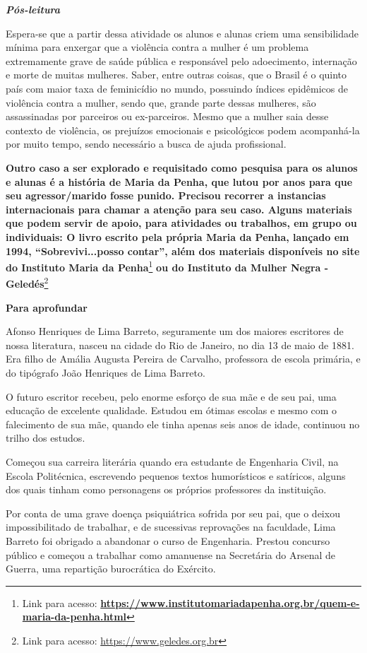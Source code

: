 \emph{\textbf{Pós-leitura}}

Espera-se que a partir dessa atividade os alunos e alunas criem uma
sensibilidade mínima para enxergar que a violência contra a mulher é um
problema extremamente grave de saúde pública e responsável pelo
adoecimento, internação e morte de muitas mulheres. Saber, entre outras
coisas, que o Brasil é o quinto país com maior taxa de feminicídio no
mundo, possuindo índices epidêmicos de violência contra a mulher, sendo
que, grande parte dessas mulheres, são assassinadas por parceiros ou
ex-parceiros. Mesmo que a mulher saia desse contexto de violência, os
prejuízos emocionais e psicológicos podem acompanhá-la por muito tempo,
sendo necessário a busca de ajuda profissional.

\textbf{Outro caso a ser explorado e requisitado como pesquisa para os
alunos e alunas é a história de Maria da Penha, que lutou por anos para
que seu agressor/marido fosse punido. Precisou recorrer a instancias
internacionais para chamar a atenção para seu caso. Alguns materiais que
podem servir de apoio, para atividades ou trabalhos, em grupo ou
individuais: O livro escrito pela própria Maria da Penha, lançado em
1994, ``Sobrevivi...posso contar'', além dos materiais disponíveis no
site do Instituto Maria da Penha}\footnote{Link para acesso:
  \textbf{\url{https://www.institutomariadapenha.org.br/quem-e-maria-da-penha.html}}}
\textbf{ou do Instituto da Mulher Negra - Geledés}\footnote{Link para
  acesso: \url{https://www.geledes.org.br}}

\textbf{Para aprofundar}

Afonso Henriques de Lima Barreto, seguramente um dos maiores escritores
de nossa literatura, nasceu na cidade do Rio de Janeiro, no dia 13 de
maio de 1881. Era filho de Amália Augusta Pereira de Carvalho,
professora de escola primária, e do tipógrafo João Henriques de Lima
Barreto.

O futuro escritor recebeu, pelo enorme esforço de sua mãe e de seu pai,
uma educação de excelente qualidade. Estudou em ótimas escolas e mesmo
com o falecimento de sua mãe, quando ele tinha apenas seis anos de
idade, continuou no trilho dos estudos.

Começou sua carreira literária quando era estudante de Engenharia Civil,
na Escola Politécnica, escrevendo pequenos textos humorísticos e
satíricos, alguns dos quais tinham como personagens os próprios
professores da instituição.

Por conta de uma grave doença psiquiátrica sofrida por seu pai, que o
deixou impossibilitado de trabalhar, e de sucessivas reprovações na
faculdade, Lima Barreto foi obrigado a abandonar o curso de Engenharia.
Prestou concurso público e começou a trabalhar como amanuense na
Secretária do Arsenal de Guerra, uma repartição burocrática do Exército.

